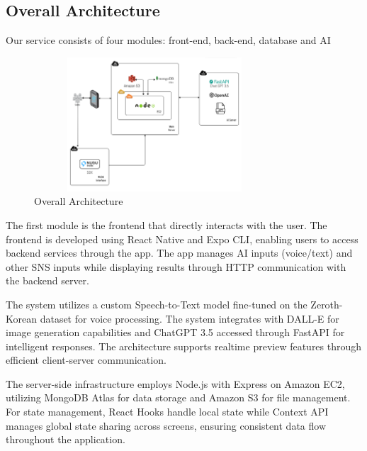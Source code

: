     \subsection{Overall Architecture}
        Our service consists of four modules: front-end, back-end, database and AI\\
            \begin{figure}[htbp]
                \centerline{\includegraphics[width = 9cm, height = 5cm]{Images/struct/hlarchi.png}}
                \label{fig}
                \caption{Overall Architecture}
            \end{figure}
            
                The first module is the frontend that directly interacts with the user. The frontend is developed using React Native and Expo CLI, enabling users to access backend services through the app. The app manages AI inputs (voice/text) and other SNS inputs while displaying results through HTTP communication with the backend server.
                
                The system utilizes a custom Speech-to-Text model fine-tuned on the Zeroth-Korean dataset for voice processing. The system integrates with DALL-E for image generation capabilities and ChatGPT 3.5 accessed through FastAPI for intelligent responses. The architecture supports realtime preview features through efficient client-server communication.
                
                The server-side infrastructure employs Node.js with Express on Amazon EC2, utilizing MongoDB Atlas for data storage and Amazon S3 for file management. For state management, React Hooks handle local state while Context API manages global state sharing across screens, ensuring consistent data flow throughout the application.
            
